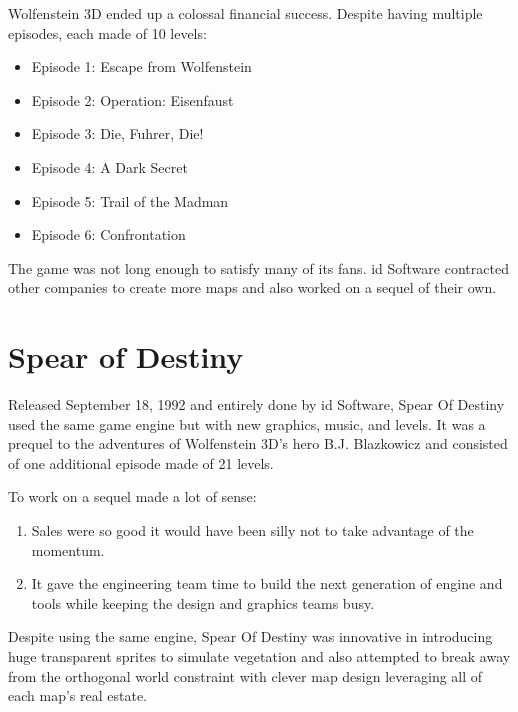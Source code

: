 \documentclass[book.tex]{subfiles}
\begin{document}
Wolfenstein 3D ended up a colossal financial success. Despite having multiple episodes, each made of 10 levels:\\
\par
\begin{itemize}
\item Episode 1: Escape from Wolfenstein
\item Episode 2: Operation: Eisenfaust
\item Episode 3: Die, Fuhrer, Die!
\item Episode 4: A Dark Secret
\item Episode 5: Trail of the Madman
\item Episode 6: Confrontation
\end{itemize}
The game was not long enough to satisfy many of its fans. id Software contracted other companies to create more maps and also worked on a sequel of their own.

\section{Spear of Destiny}
Released September 18, 1992 and entirely done by id Software, Spear Of Destiny used the same game engine but with new graphics, music, and levels. It was a prequel to the adventures of Wolfenstein 3D's hero B.J. Blazkowicz and consisted of one additional episode made of 21 levels.\\
   \par
\begin{figure}[H]
\centering
 \end{figure}
 \par
 To work on a sequel made a lot of sense:
 \begin{enumerate}
 \item Sales were so good it would have been silly not to take advantage of the momentum.
 \item It gave the engineering team time to build the next generation of engine and tools while keeping the design and graphics teams busy.
 \end{enumerate}
Despite using the same engine, Spear Of Destiny was innovative in introducing huge transparent sprites to simulate vegetation and also attempted to break away from the orthogonal world constraint with clever map design leveraging all of each map's real estate.
    \par
\begin{figure}[H]
\centering
 \end{figure}
 \par
\end{document}
